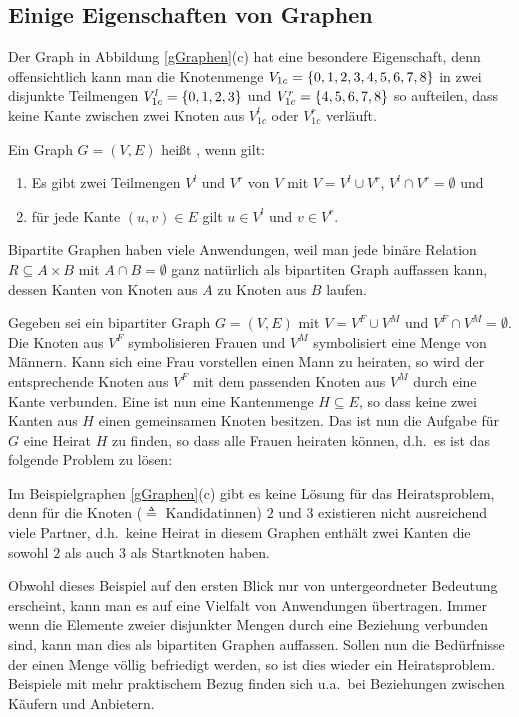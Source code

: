 \subsection{Einige Eigenschaften von Graphen}
Der Graph in Abbildung \ref{gGraphen}(c) hat eine besondere
Eigenschaft, denn offensichtlich kann man die Knotenmenge $V_{1c}
= \{0,1,2,3,4,5,6,7,8\}$ in zwei disjunkte Teilmengen $V_{1c}^l
= \{0,1,2,3\}$ und $V_{1c}^r = \{4,5,6,7,8\}$ so aufteilen, dass
keine Kante zwischen zwei Knoten aus $V_{1c}^l$ oder $V_{1c}^r$
verläuft.

\begin{definition}
Ein Graph $G = (V,E)$ heißt , wenn gilt:
\begin{enumerate}
%
\item Es gibt zwei Teilmengen $V^l$ und $V^r$ von $V$ mit $V =
V^l \cup V^r$, $V^l \cap V^r = \emptyset$ und 
%
\item für jede Kante $(u,v) \in E$ gilt $u \in V^l$ und $v \in V^r$.
%
\end{enumerate}
\end{definition}

Bipartite Graphen haben viele Anwendungen, weil man jede binäre
Relation $R \subseteq A \times B$ mit $A \cap B = \emptyset$ ganz
natürlich als bipartiten Graph auffassen kann, dessen Kanten von
Knoten aus $A$ zu Knoten aus $B$ laufen.

\begin{example}
Gegeben sei ein bipartiter Graph $G = (V,E)$ mit $V = V^F \cup V^M$
und $V^F \cap V^M = \emptyset$. Die Knoten aus $V^F$ symbolisieren
Frauen und $V^M$ symbolisiert eine Menge von Männern. Kann sich eine
Frau vorstellen einen Mann zu heiraten, so wird der entsprechende
Knoten aus $V^F$ mit dem passenden Knoten aus $V^M$ durch eine Kante
verbunden.  Eine  ist nun eine Kantenmenge $H \subseteq
E$, so dass keine zwei Kanten aus $H$ einen gemeinsamen Knoten
besitzen. Das  ist nun die Aufgabe für $G$ eine
Heirat $H$ zu finden, so dass alle Frauen heiraten können, d.h.~es ist
das folgende Problem zu lösen:

\goodbreak
{}

Im Beispielgraphen \ref{gGraphen}(c) gibt es keine Lösung für das
Heiratsproblem, denn für die Knoten ($\triangleq$ Kandidatinnen) $2$ und
$3$ existieren nicht ausreichend viele Partner, d.h.~keine Heirat in
diesem Graphen enthält zwei Kanten die sowohl $2$ als auch $3$ als
Startknoten haben.

\medskip

Obwohl dieses Beispiel auf den ersten Blick nur von untergeordneter
Bedeutung erscheint, kann man es auf eine Vielfalt von Anwendungen
übertragen. Immer wenn die Elemente zweier disjunkter Mengen durch
eine Beziehung verbunden sind, kann man dies als bipartiten Graphen
auffassen. Sollen nun die Bedürfnisse der einen Menge völlig
befriedigt werden, so ist dies wieder ein Heiratsproblem. Beispiele
mit mehr praktischem Bezug finden sich u.a.~bei Beziehungen zwischen
Käufern und Anbietern.
\end{example}

